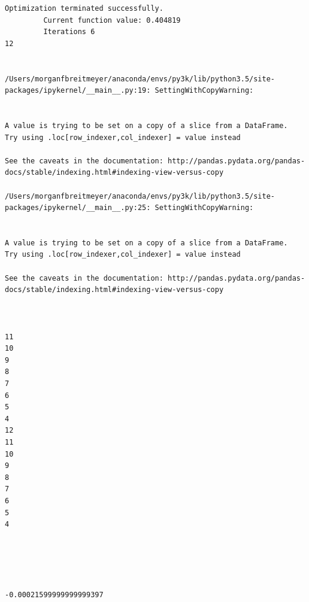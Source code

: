 \begin{lstlisting}
Optimization terminated successfully.
         Current function value: 0.404819
         Iterations 6
12


/Users/morganfbreitmeyer/anaconda/envs/py3k/lib/python3.5/site-packages/ipykernel/__main__.py:19: SettingWithCopyWarning:


A value is trying to be set on a copy of a slice from a DataFrame.
Try using .loc[row_indexer,col_indexer] = value instead

See the caveats in the documentation: http://pandas.pydata.org/pandas-docs/stable/indexing.html#indexing-view-versus-copy

/Users/morganfbreitmeyer/anaconda/envs/py3k/lib/python3.5/site-packages/ipykernel/__main__.py:25: SettingWithCopyWarning:


A value is trying to be set on a copy of a slice from a DataFrame.
Try using .loc[row_indexer,col_indexer] = value instead

See the caveats in the documentation: http://pandas.pydata.org/pandas-docs/stable/indexing.html#indexing-view-versus-copy



11
10
9
8
7
6
5
4
12
11
10
9
8
7
6
5
4





-0.00021599999999999397
\end{lstlisting}

